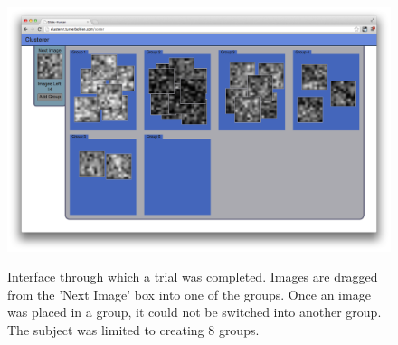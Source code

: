\begin{figure}
\centering
\includegraphics[width=5.6in]{img/clusterer.png}
\label{fig:clusterer}
\caption{Interface through which a trial was completed. Images are dragged from
  the 'Next Image' box into one of the groups. Once an image was placed in a
  group, it could not be switched into another group.  The subject was limited
  to creating 8 groups.}
\end{figure}